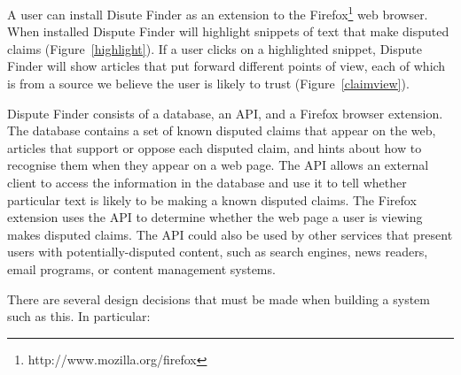 \documentclass{www2010-submission}
\newcommand{\todo}[1]{}
\begin{document}
A user can install Disute Finder as an extension to the Firefox\footnote{http://www.mozilla.org/firefox} web browser. When installed Dispute Finder will highlight snippets of text that make disputed claims (Figure~\ref{highlight}). 
If a user clicks on a highlighted snippet, Dispute Finder will show articles that put forward different points of view,  each of which is from a source we believe the user is likely to trust (Figure~\ref{claimview}). 

Dispute Finder consists of a database, an API, and a Firefox browser extension. The database contains a set of known disputed claims that appear on the web, articles that support or oppose each disputed claim, and hints about how to recognise them when they appear on a web page. The API allows an external client to access the information in the database and use it to tell whether particular text is likely to be making a known disputed claims. The Firefox extension uses the API to determine whether the web page a user is viewing makes disputed claims. The API could also be used by other services that present users with potentially-disputed content, such as search engines, news readers, email programs, or content management systems.

\todo{Figure that does a smaller highlight}

There are several design decisions that must be made when building a system such as this. In particular:
\end{document}

